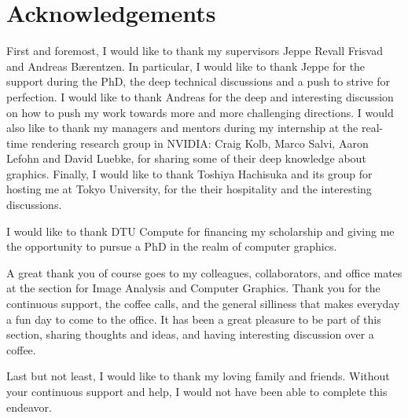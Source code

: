 \chapter{Acknowledgements}

First and foremost, I would like to thank my supervisors Jeppe Revall Frisvad and Andreas B\ae rentzen. In particular, I would like to thank Jeppe for the support during the PhD, the deep technical discussions and a push to strive for perfection. I would like to thank Andreas for the deep and interesting discussion on how to push my work towards more and more challenging directions. I would also like to thank my managers and mentors during my internship at the real-time rendering research group in NVIDIA: Craig Kolb, Marco Salvi, Aaron Lefohn and David Luebke, for sharing some of their deep knowledge about graphics. Finally, I would like to thank Toshiya Hachisuka and its group for hosting me at Tokyo University, for the their hospitality and the interesting discussions.

I would like to thank DTU Compute for financing my scholarship and giving me the opportunity to pursue a PhD in the realm of computer graphics.

A great thank you of course goes to my colleagues, collaborators, and office mates at the section for Image Analysis and Computer Graphics. Thank you for the continuous support, the coffee calls, and the general silliness that makes everyday a fun day to come to the office. It has been a great pleasure to be part of this section, sharing thoughts and ideas, and having interesting discussion over a coffee.

Last but not least, I would like to thank my loving family and friends. Without your continuous support and help, I would not have been able to complete this endeavor. 